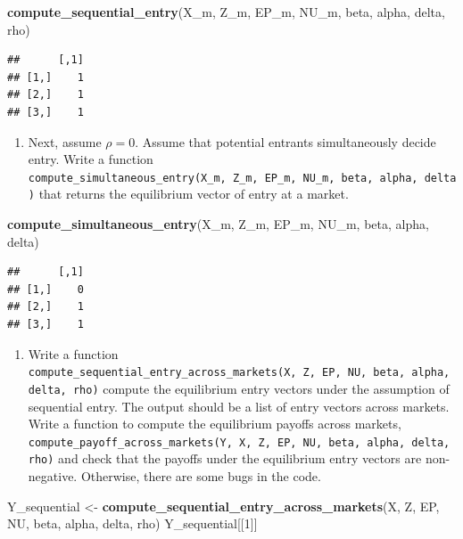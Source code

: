 \documentclass[]{book}
\newenvironment{Shaded}{\begin{snugshade}}{\end{snugshade}}
\newcommand{\KeywordTok}[1]{\textcolor[rgb]{0.13,0.29,0.53}{\textbf{#1}}}
\newcommand{\DecValTok}[1]{\textcolor[rgb]{0.00,0.00,0.81}{#1}}
\newcommand{\StringTok}[1]{\textcolor[rgb]{0.31,0.60,0.02}{#1}}
\newcommand{\NormalTok}[1]{#1}
\providecommand{\tightlist}{%
  \setlength{\itemsep}{0pt}\setlength{\parskip}{0pt}}
\begin{document}
\begin{Shaded}
\begin{Highlighting}[]
\KeywordTok{compute_sequential_entry}\NormalTok{(X_m, Z_m, EP_m, NU_m, beta, alpha, delta, rho)}
\end{Highlighting}
\end{Shaded}

\begin{verbatim}
##      [,1]
## [1,]    1
## [2,]    1
## [3,]    1
\end{verbatim}

\begin{enumerate}
\def\labelenumi{\arabic{enumi}.}
\setcounter{enumi}{5}
\tightlist
\item
  Next, assume \(\rho = 0\). Assume that potential entrants
  simultaneously decide entry. Write a function
  \texttt{compute\_simultaneous\_entry(X\_m,\ Z\_m,\ EP\_m,\ NU\_m,\ beta,\ alpha,\ delta)}
  that returns the equilibrium vector of entry at a market.
\end{enumerate}

\begin{Shaded}
\begin{Highlighting}[]
\KeywordTok{compute_simultaneous_entry}\NormalTok{(X_m, Z_m, EP_m, NU_m, beta, alpha, delta)}
\end{Highlighting}
\end{Shaded}

\begin{verbatim}
##      [,1]
## [1,]    0
## [2,]    1
## [3,]    1
\end{verbatim}

\begin{enumerate}
\def\labelenumi{\arabic{enumi}.}
\setcounter{enumi}{6}
\tightlist
\item
  Write a function
  \texttt{compute\_sequential\_entry\_across\_markets(X,\ Z,\ EP,\ NU,\ beta,\ alpha,\ delta,\ rho)}
  compute the equilibrium entry vectors under the assumption of
  sequential entry. The output should be a list of entry vectors across
  markets. Write a function to compute the equilibrium payoffs across
  markets,
  \texttt{compute\_payoff\_across\_markets(Y,\ X,\ Z,\ EP,\ NU,\ beta,\ alpha,\ delta,\ rho)}
  and check that the payoffs under the equilibrium entry vectors are
  non-negative. Otherwise, there are some bugs in the code.
\end{enumerate}

\begin{Shaded}
\begin{Highlighting}[]
\NormalTok{Y_sequential <-}
\StringTok{  }\KeywordTok{compute_sequential_entry_across_markets}\NormalTok{(X, Z, EP, NU, beta, alpha, delta, rho)}
\NormalTok{Y_sequential[[}\DecValTok{1}\NormalTok{]]}
\end{Highlighting}
\end{Shaded}
\end{document}
